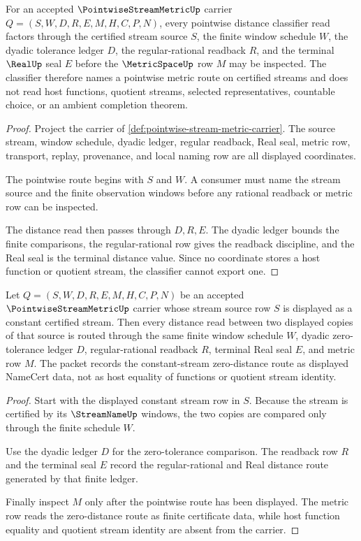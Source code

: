 \begin{theorem}
\label{thm:pointwise-stream-metric-pointwise-classifier}
For an accepted $\PointwiseStreamMetricUp$ carrier $Q=(S,W,D,R,E,M,H,C,P,N)$, every pointwise distance classifier read factors through the certified stream source $S$, the finite window schedule $W$, the dyadic tolerance ledger $D$, the regular-rational readback $R$, and the terminal $\RealUp$ seal $E$ before the $\MetricSpaceUp$ row $M$ may be inspected. The classifier therefore names a pointwise metric route on certified streams and does not read host functions, quotient streams, selected representatives, countable choice, or an ambient completion theorem.
\end{theorem}
\begin{proof}
Project the carrier of \autoref{def:pointwise-stream-metric-carrier}. The source stream, window schedule, dyadic ledger, regular readback, Real seal, metric row, transport, replay, provenance, and local naming row are all displayed coordinates.

The pointwise route begins with $S$ and $W$. A consumer must name the stream source and the finite observation windows before any rational readback or metric row can be inspected.

The distance read then passes through $D,R,E$. The dyadic ledger bounds the finite comparisons, the regular-rational row gives the readback discipline, and the Real seal is the terminal distance value. Since no coordinate stores a host function or quotient stream, the classifier cannot export one.
\end{proof}

\begin{theorem}
\label{thm:pointwise-stream-metric-constant-stream}
Let $Q=(S,W,D,R,E,M,H,C,P,N)$ be an accepted $\PointwiseStreamMetricUp$ carrier whose stream source row $S$ is displayed as a constant certified stream. Then every distance read between two displayed copies of that source is routed through the same finite window schedule $W$, dyadic zero-tolerance ledger $D$, regular-rational readback $R$, terminal Real seal $E$, and metric row $M$. The packet records the constant-stream zero-distance route as displayed NameCert data, not as host equality of functions or quotient stream identity.
\end{theorem}
\begin{proof}
Start with the displayed constant stream row in $S$. Because the stream is certified by its $\StreamNameUp$ windows, the two copies are compared only through the finite schedule $W$.

Use the dyadic ledger $D$ for the zero-tolerance comparison. The readback row $R$ and the terminal seal $E$ record the regular-rational and Real distance route generated by that finite ledger.

Finally inspect $M$ only after the pointwise route has been displayed. The metric row reads the zero-distance route as finite certificate data, while host function equality and quotient stream identity are absent from the carrier.
\end{proof}

